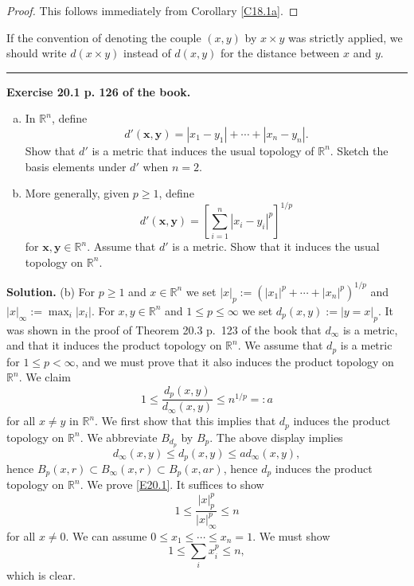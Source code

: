 \documentclass[12pt,letterpaper]{article}
\newcommand{\noi}{\noindent}%
\newcommand{\R}{\mathbb R}
\begin{document}
\begin{proof}
This follows immediately from Corollary \ref{C18.1a}. 
\end{proof} 

If the convention of denoting the couple $(x,y)$ by $x\times y$ was strictly applied, we should write $d(x\times y)$ instead of $d(x,y)$ for the distance between $x$ and $y$. 

\bigskip\hrule\medskip 

\noi\textbf{Exercise 20.1 p. 126 of the book.} 
    \begin{enumerate}[(a)]
        \item In $\mathbb{R}^{n}$, define
        \[
        d'(\mathbf{x}, \mathbf{y})=\left|x_1-y_1\right|+\cdots+\left|x_{n}-y_{n}\right|.
        \]
        Show that $d'$ is a metric that induces the usual topology of $\mathbb{R}^{n}$. Sketch the basis elements under $d'$ when $n=2$.

        \item More generally, given $p\geq1$, define
        \[
        d'(\mathbf{x}, \mathbf{y})=\left[\sum_{i=1}^{n}\left|x_{i}-y_{i}\right|^{p}\right]^{1 / p}
        \]
        for $\mathbf{x}, \mathbf{y} \in \mathbb{R}^{n}$. Assume that $d'$ is a metric. Show that it induces the usual topology on $\mathbb{R}^{n}$.
    \end{enumerate}

\noi\textbf{Solution.} (b) For $p\ge1$ and $x\in\R^n$ we set $|x|_p:=(|x_1|^p+\cdots+|x_n|^p)^{1/p}$ and $|x|_\infty:=\max_i|x_i|$. For $x,y\in\R^n$ and $1\le p\le\infty$ we set $d_p(x,y):=|y=x|_p$. It was shown in the proof of Theorem 20.3 p.~123 of the book that $d_\infty$ is a metric, and that it induces the product topology on $\R^n$. We assume that $d_p$ is a metric for $1\le p<\infty$, and we must prove that it also induces the product topology on $\R^n$. We claim 
\begin{equation}\label{E20.1}
1\le\frac{d_p(x,y)}{d_\infty(x,y)}\le n^{1/p}=:a
\end{equation} 
for all $x\ne y$ in $\R^n$. We first show that this implies that $d_p$ induces the product topology on $\R^n$. We abbreviate $B_{d_p}$ by $B_p$. The above display implies 
$$
d_\infty(x,y)\le d_p(x,y)\le ad_\infty(x,y), 
$$ 
hence $B_p(x,r)\subset B_\infty(x,r)\subset B_p(x,ar)$, hence $d_p$ induces the product topology on $\R^n$. We prove \eqref{E20.1}. It suffices to show 
$$
1\le\frac{|x|_p^p}{|x|_\infty^p}\le n
$$  
for all $x\ne0$. We can assume $0\le x_1\le\cdots\le x_n=1$. We must show 
$$
1\le\sum_ix_i^p\le n,
$$ 
which is clear. 
\end{document}
